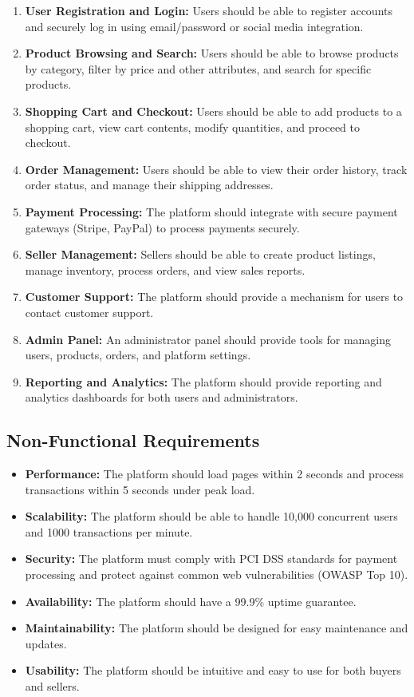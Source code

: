 \documentclass[11pt,a4paper,oneside]{article}
\begin{document}
\begin{enumerate}
    \item \textbf{User Registration and Login:} Users should be able to register accounts and securely log in using email/password or social media integration.
    \item \textbf{Product Browsing and Search:}  Users should be able to browse products by category, filter by price and other attributes, and search for specific products.
    \item \textbf{Shopping Cart and Checkout:} Users should be able to add products to a shopping cart, view cart contents, modify quantities, and proceed to checkout.
    \item \textbf{Order Management:} Users should be able to view their order history, track order status, and manage their shipping addresses.
    \item \textbf{Payment Processing:} The platform should integrate with secure payment gateways (Stripe, PayPal) to process payments securely.
    \item \textbf{Seller Management:} Sellers should be able to create product listings, manage inventory, process orders, and view sales reports.
    \item \textbf{Customer Support:} The platform should provide a mechanism for users to contact customer support.
    \item \textbf{Admin Panel:} An administrator panel should provide tools for managing users, products, orders, and platform settings.
    \item \textbf{Reporting and Analytics:} The platform should provide reporting and analytics dashboards for both users and administrators.
\end{enumerate}

\subsection{Non-Functional Requirements}

\begin{itemize}
    \item \textbf{Performance:} The platform should load pages within 2 seconds and process transactions within 5 seconds under peak load.
    \item \textbf{Scalability:} The platform should be able to handle 10,000 concurrent users and 1000 transactions per minute.
    \item \textbf{Security:} The platform must comply with PCI DSS standards for payment processing and protect against common web vulnerabilities (OWASP Top 10).
    \item \textbf{Availability:} The platform should have a 99.9\% uptime guarantee.
    \item \textbf{Maintainability:} The platform should be designed for easy maintenance and updates.
    \item \textbf{Usability:} The platform should be intuitive and easy to use for both buyers and sellers.
\end{itemize}
\end{document}

